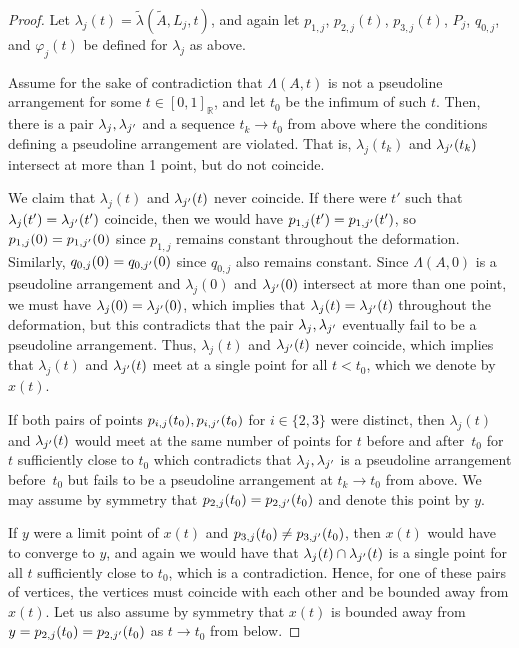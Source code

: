 \documentclass[11pt]{article}
\numberwithin{equation}{section}
\theoremstyle{remark}
\let\mb\mathbb
\let\phi\varphi
\begin{document}
\begin{proof}
Let $\lambda_j(t)=\tilde \lambda(\tilde A, L_j,t)$, and again let $p_{1,j}$, $p_{2,j}(t)$, $p_{3,j}(t)$, $P_j$, $q_{0,j}$, and $\phi_j(t)$ be defined for $\lambda_j$ as above.

Assume for the sake of contradiction that $\Lambda(A,t)$ is not a pseudoline arrangement for some $t\in [0,1]_\mb{R}$, and let $t_0$ be the infimum of such $t$.
Then, there is a pair $\lambda_j,\lambda_{j'}$ and a sequence $t_k \to t_0$ from above where the conditions defining a pseudoline arrangement are violated.
That is, $\lambda_j(t_k)$ and $\lambda_{j'}(t_k)$ intersect at more than 1 point, but do not coincide.

We claim that $\lambda_j(t)$ and $\lambda_{j'}(t)$ never coincide. If there were $t'$ such that $\lambda_j(t')=\lambda_{j'}(t')$ coincide, then we would have $p_{1,j}(t') = p_{1,{j'}}(t')$, so $p_{1,j}(0) = p_{1,{j'}}(0)$ since $p_{1,j}$ remains constant throughout the deformation.
Similarly, $q_{0,j}(0) = q_{0,{j'}}(0)$ since $q_{0,j}$ also remains constant.
Since $\Lambda(A,0)$ is a pseudoline arrangement and $\lambda_j(0)$ and $\lambda_{j'}(0)$ intersect at more than one point, we must have $\lambda_j(0) = \lambda_{j'}(0)$, which implies that $\lambda_j(t) = \lambda_{j'}(t)$ throughout the deformation, but this contradicts that the pair $\lambda_j,\lambda_{j'}$ eventually fail to be a pseudoline arrangement.
Thus, $\lambda_j(t)$ and $\lambda_{j'}(t)$ never coincide,
which implies that $\lambda_j(t)$ and $\lambda_{j'}(t)$ meet at a single point for all $t<t_0$, which we denote by $x(t)$.

If both pairs of points $p_{i,j}(t_0),p_{i,{j'}}(t_0)$ for $i \in \{2,3\}$ were distinct, then $\lambda_j(t)$ and $\lambda_{j'}(t)$ would meet at the same number of points for $t$ before and after~$t_0$ for~$t$ sufficiently close to $t_0$ which contradicts that $\lambda_j,\lambda_{j'}$ is a pseudoline arrangement before~$t_0$ but fails to be a pseudoline arrangement at $t_k \to t_0$ from above.
We may assume by symmetry that $p_{2,j}(t_0) = p_{2,{j'}}(t_0)$ and denote this point by $y$.

If $y$ were a limit point of $x(t)$
and $p_{3,j}(t_0) \neq p_{3,{j'}}(t_0)$, then $x(t)$ would have to converge to $y$, and again we would have that $\lambda_j(t)\cap \lambda_{j'}(t)$ is a single point for all $t$ sufficiently close to $t_0$, which is a contradiction. Hence, for one of these pairs of vertices, the vertices must coincide with each other and be bounded away from $x(t)$.
Let us also assume by symmetry that $x(t)$ is bounded away from $y = p_{2,j}(t_0) = p_{2,{j'}}(t_0)$ as $t \to t_0$ from below.


\end{proof}
\end{document}
